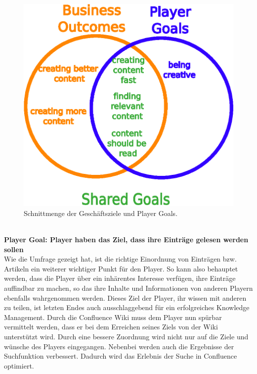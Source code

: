 \documentclass[a4paper,12pt]{scrartcl}
\begin{document}
\\\\
\begin{figure}[h!]
\begin{center}
\includegraphics[scale = 0.9]{Bilder/Schnittmenge.eps}
\caption{Schnittmenge der Geschäftsziele und Player Goals.}
\label{Schnittmenge}
\end{center}
\end{figure}
\\
\textbf{Player Goal: Player haben das Ziel, dass ihre Einträge gelesen werden sollen}\\
Wie die Umfrage gezeigt hat, ist die richtige Einordnung von Einträgen bzw. Artikeln ein weiterer wichtiger Punkt für den Player. So kann also behauptet werden, dass die Player über ein inhärentes Interesse verfügen, ihre Einträge auffindbar zu machen, so das ihre Inhalte und Informationen von anderen Playern ebenfalls wahrgenommen werden. Dieses Ziel der Player, ihr wissen mit anderen zu teilen, ist letzten Endes auch ausschlaggebend für ein erfolgreiches Knowledge Management. Durch die Confluence Wiki muss dem Player nun spürbar vermittelt werden, dass er bei dem Erreichen seines Ziels von der Wiki unterstützt wird. Durch eine bessere Zuordnung wird nicht nur auf die Ziele und wünsche des Players eingegangen. Nebenbei werden auch die Ergebnisse der Suchfunktion verbessert. Dadurch wird das Erlebnis der Suche in Confluence optimiert.
\end{document}

